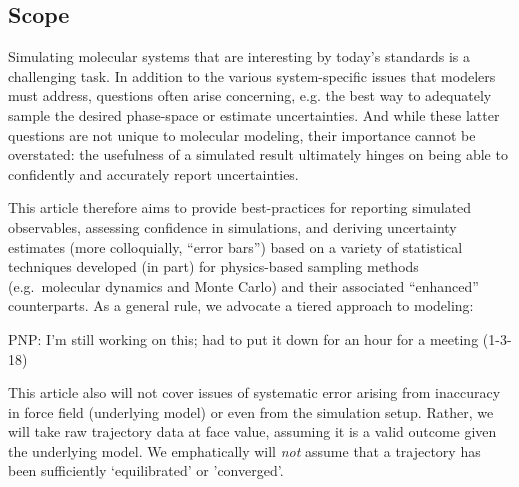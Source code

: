 \subsection{Scope}

Simulating molecular systems that are interesting by today's standards is a challenging task.  In addition to the various system-specific issues that modelers must address, questions often arise concerning, e.g. the best way to adequately sample the desired phase-space or estimate uncertainties.  And while these latter questions are not unique to molecular modeling, their importance cannot be overstated: the usefulness of a simulated result ultimately hinges on being able to confidently and accurately report uncertainties.  

This article therefore aims to provide best-practices for reporting simulated observables, assessing confidence in simulations, and deriving uncertainty estimates (more colloquially, ``error bars'') based on a variety of statistical techniques developed (in part) for physics-based sampling methods (e.g.\ molecular dynamics and Monte Carlo) and their associated ``enhanced'' counterparts.  As a general rule, we advocate a tiered approach to modeling:

PNP: I'm still working on this; had to put it down for an hour for a meeting (1-3-18)



This article also will not cover issues of systematic error arising from inaccuracy in force field (underlying model) or even from the simulation setup.
Rather, we will take raw trajectory data at face value, assuming it is a valid outcome given the underlying model.
We emphatically will \emph{not} assume that a trajectory has been sufficiently `equilibrated' or 'converged'.
